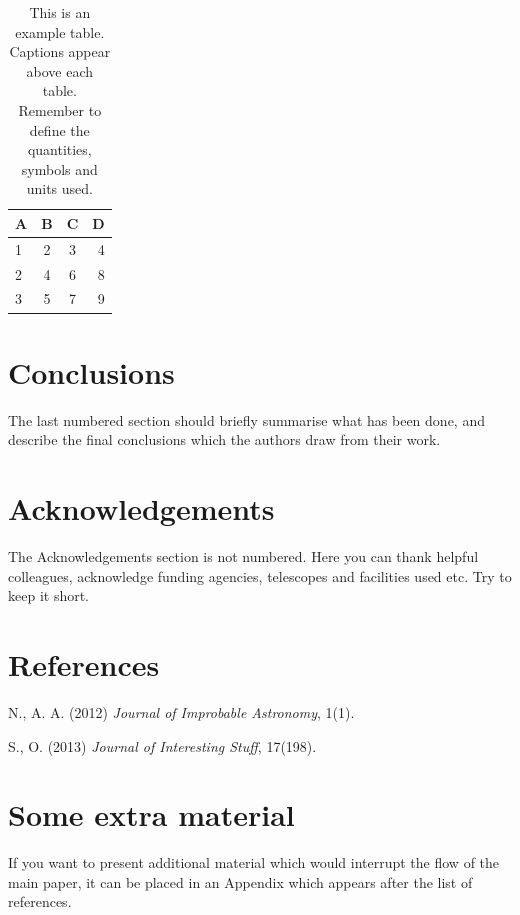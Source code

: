 \documentclass[a4paper,fleqn,usenatbib]{mnras}
\begin{document}
\begin{table}
  \centering
  \caption{This is an example table. Captions appear above each table.
  Remember to define the quantities, symbols and units used.}
  \label{tab:example_table}
  \begin{tabular}{lccr} %
    \hline
    A & B & C & D\\
    \hline
    1 & 2 & 3 & 4\\
    2 & 4 & 6 & 8\\
    3 & 5 & 7 & 9\\
    \hline
  \end{tabular}
\end{table}

\hypertarget{conclusions}{%
\section{Conclusions}\label{conclusions}}

The last numbered section should briefly summarise what has been done,
and describe the final conclusions which the authors draw from their
work.

\hypertarget{acknowledgements}{%
\section*{Acknowledgements}\label{acknowledgements}}

The Acknowledgements section is not numbered. Here you can thank helpful
colleagues, acknowledge funding agencies, telescopes and facilities used
etc. Try to keep it short.

\hypertarget{references}{%
\section*{References}\label{references}}

\hypertarget{refs}{}
\leavevmode\hypertarget{ref-Author2012}{}%
N., A. A. (2012) \emph{Journal of Improbable Astronomy}, 1(1).

\leavevmode\hypertarget{ref-Others2013}{}%
S., O. (2013) \emph{Journal of Interesting Stuff}, 17(198).

\appendix

\hypertarget{some-extra-material}{%
\section{Some extra material}\label{some-extra-material}}

If you want to present additional material which would interrupt the
flow of the main paper, it can be placed in an Appendix which appears
after the list of references.



\bsp	%
\label{lastpage}
\end{document}
